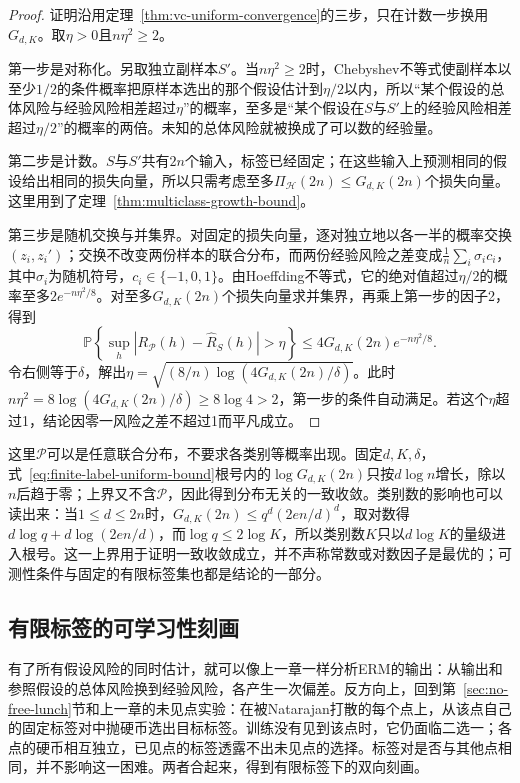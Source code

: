 \begin{proof}
证明沿用定理~\ref{thm:vc-uniform-convergence}的三步，只在计数一步换用$G_{d,K}$。取$\eta>0$且$n\eta^2\geq2$。

第一步是对称化。另取独立副样本$S'$。当$n\eta^2\geq2$时，Chebyshev不等式使副样本以至少$1/2$的条件概率把原样本选出的那个假设估计到$\eta/2$以内，所以“某个假设的总体风险与经验风险相差超过$\eta$”的概率，至多是“某个假设在$S$与$S'$上的经验风险相差超过$\eta/2$”的概率的两倍。未知的总体风险就被换成了可以数的经验量。

第二步是计数。$S$与$S'$共有$2n$个输入，标签已经固定；在这些输入上预测相同的假设给出相同的损失向量，所以只需考虑至多$\Pi_{\mathcal H}(2n)\leq G_{d,K}(2n)$个损失向量。这里用到了定理~\ref{thm:multiclass-growth-bound}。

第三步是随机交换与并集界。对固定的损失向量，逐对独立地以各一半的概率交换$(z_i,z_i')$；交换不改变两份样本的联合分布，而两份经验风险之差变成$\frac1n\sum_i\sigma_ic_i$，其中$\sigma_i$为随机符号，$c_i\in\{-1,0,1\}$。由Hoeffding不等式，它的绝对值超过$\eta/2$的概率至多$2e^{-n\eta^2/8}$。对至多$G_{d,K}(2n)$个损失向量求并集界，再乘上第一步的因子2，得到
\[
 \mathbb P\!\left\{\sup_h|R_{\mathcal P}(h)-\hat R_S(h)|>\eta\right\}
 \leq4G_{d,K}(2n)e^{-n\eta^2/8}.
\]
令右侧等于$\delta$，解出$\eta=\sqrt{(8/n)\log(4G_{d,K}(2n)/\delta)}$。此时$n\eta^2=8\log(4G_{d,K}(2n)/\delta)\geq8\log4>2$，第一步的条件自动满足。若这个$\eta$超过1，结论因零一风险之差不超过1而平凡成立。
\end{proof}

这里$\mathcal P$可以是任意联合分布，不要求各类别等概率出现。固定$d,K,\delta$，式~\eqref{eq:finite-label-uniform-bound}根号内的$\log G_{d,K}(2n)$只按$d\log n$增长，除以$n$后趋于零；上界又不含$\mathcal P$，因此得到分布无关的一致收敛。类别数的影响也可以读出来：当$1\leq d\leq2n$时，$G_{d,K}(2n)\leq q^d(2en/d)^d$，取对数得$d\log q+d\log(2en/d)$，而$\log q\leq2\log K$，所以类别数$K$只以$d\log K$的量级进入根号。这一上界用于证明一致收敛成立，并不声称常数或对数因子是最优的；可测性条件与固定的有限标签集也都是结论的一部分。

\subsection{有限标签的可学习性刻画}
\label{sec:lt6-finite-label-characterization}

有了所有假设风险的同时估计，就可以像上一章一样分析ERM的输出：从输出和参照假设的总体风险换到经验风险，各产生一次偏差。反方向上，回到第~\ref{sec:no-free-lunch}节和上一章的未见点实验：在被Natarajan打散的每个点上，从该点自己的固定标签对中抛硬币选出目标标签。训练没有见到该点时，它仍面临二选一；各点的硬币相互独立，已见点的标签透露不出未见点的选择。标签对是否与其他点相同，并不影响这一困难。两者合起来，得到有限标签下的双向刻画。

